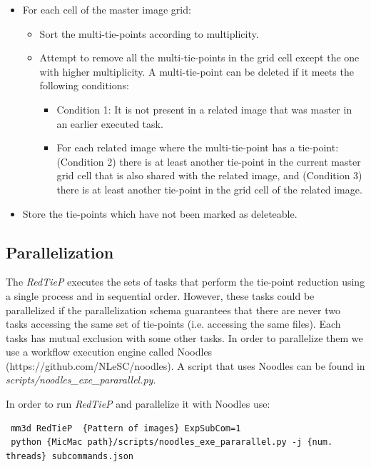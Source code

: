 \begin{itemize}
\begin{itemize}
   \item For each cell of the master image grid:
      \begin{itemize}
       \item Sort the multi-tie-points according to multiplicity.
       \item Attempt to remove all the multi-tie-points in the grid cell except the one with higher multiplicity. A multi-tie-point can be deleted if it meets the following conditions:
          \begin{itemize}
          \item Condition 1: It is not present in a related image that was master in an earlier executed task.
          \item For each related image where the multi-tie-point has a tie-point: (Condition 2) there is at least another tie-point in the current master grid cell that is also shared with the related image, and (Condition 3) there is at least another tie-point in the grid cell of the related image. 
          \end{itemize}
      \end{itemize}
   \item Store the tie-points which have not been marked as deleteable.
   \end{itemize}
\end{itemize}

\subsection{Parallelization}

The \textit{RedTieP} executes the sets of tasks that perform the tie-point reduction using a single process and in sequential order. However, these tasks could be parallelized if the parallelization schema guarantees that there are never two tasks accessing the same set of tie-points (i.e. accessing the same files). Each tasks has mutual exclusion with some other tasks. In order to parallelize them we use a workflow execution engine called Noodles (https://github.com/NLeSC/noodles). A script that uses Noodles can be found in \textit{scripts/noodles\_exe\_pararallel.py}.

In order to run \textit{RedTieP} and parallelize it with Noodles use:
\begin{verbatim}
 mm3d RedTieP  {Pattern of images} ExpSubCom=1 
 python {MicMac path}/scripts/noodles_exe_pararallel.py -j {num. threads} subcommands.json
\end{verbatim}

